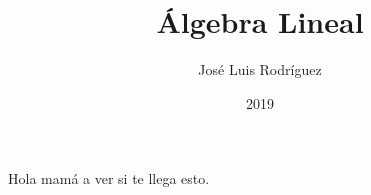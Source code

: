 \documentclass[8pt]{article}
\title{Álgebra Lineal}
\author{José Luis Rodríguez}
\date{2019}
\begin{document}
\maketitle

Hola mamá a ver si te llega esto.
\end{document}
